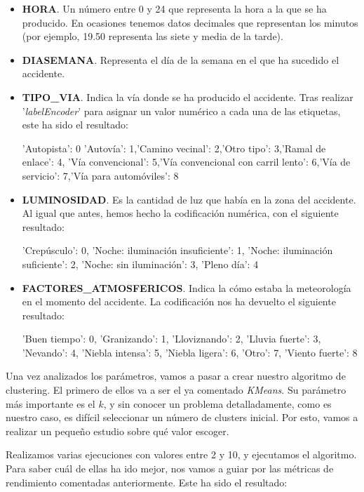 \documentclass[11pt,a4paper]{article}
\begin{document}
\begin{itemize}
    \item \textbf{HORA}. Un número entre 0 y 24 que representa la hora a la que se ha producido. En ocasiones tenemos datos decimales
          que representan los minutos (por ejemplo, 19.50 representa las siete y media de la tarde).
    
    \item \textbf{DIASEMANA}. Representa el día de la semana en el que ha sucedido el accidente.
    
    \item \textbf{TIPO\_VIA}. Indica la vía donde se ha producido el accidente. Tras realizar '\textit{labelEncoder}' para asignar un
          valor numérico a cada una de las etiquetas, este ha sido el resultado:

          'Autopista': 0 \quad 'Autovía': 1,\quad 'Camino vecinal': 2,\quad 'Otro tipo': 3,\quad 'Ramal de enlace': 4, \quad
          'Vía convencional': 5,\quad 'Vía convencional con carril lento': 6,\quad 'Vía de servicio': 7,\quad 'Vía para automóviles': 8
    
    \item \textbf{LUMINOSIDAD}. Es la cantidad de luz que había en la zona del accidente. Al igual que antes, hemos hecho la codificación
          numérica, con el siguiente resultado:
    
          'Crepúsculo': 0, 'Noche: iluminación insuficiente': 1, 'Noche: iluminación suficiente': 2, 'Noche: sin iluminación': 3,
          'Pleno día': 4
    
    \item \textbf{FACTORES\_ATMOSFERICOS}. Indica la cómo estaba la meteorología en el momento del accidente. La codificación nos ha
          devuelto el siguiente resultado:

          'Buen tiempo': 0, 'Granizando': 1, 'Lloviznando': 2, 'Lluvia fuerte': 3, 'Nevando': 4, 'Niebla intensa': 5, 'Niebla ligera': 6,
          'Otro': 7, 'Viento fuerte': 8
\end{itemize}

Una vez analizados los parámetros, vamos a pasar a crear nuestro algoritmo de clustering. El primero de ellos va a ser el ya comentado
\textit{KMeans}. Su parámetro más importante es el $k$, y sin conocer un problema detalladamente, como es nuestro caso, es difícil
seleccionar un número de clusters inicial. Por esto, vamos a realizar un pequeño estudio sobre qué valor escoger.

Realizamos varias ejecuciones con valores entre 2 y 10, y ejecutamos el algoritmo. Para saber cuál de ellas ha ido mejor, nos vamos
a guiar por las métricas de rendimiento comentadas anteriormente. Este ha sido el resultado:
\end{document}
